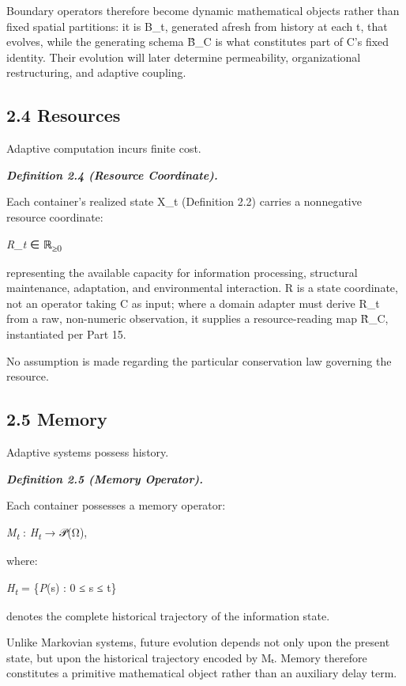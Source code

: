 \documentclass[
]{article}
\begin{document}
Boundary operators therefore become dynamic mathematical objects rather
than fixed spatial partitions: it is B\_t, generated afresh from history
at each t, that evolves, while the generating schema B̂\_C is what
constitutes part of C's fixed identity. Their evolution will later
determine permeability, organizational restructuring, and adaptive
coupling.

\hypertarget{resources}{%
\subsection{2.4 Resources}\label{resources}}

Adaptive computation incurs finite cost.

\emph{\textbf{Definition 2.4 (Resource Coordinate).}}

Each container's realized state X\_t (Definition 2.2) carries a
nonnegative resource coordinate:

\emph{R\_t} ∈ ℝ\textsubscript{≥0}

representing the available capacity for information processing,
structural maintenance, adaptation, and environmental interaction. R is
a state coordinate, not an operator taking C as input; where a domain
adapter must derive R\_t from a raw, non-numeric observation, it
supplies a resource-reading map R̂\_C, instantiated per Part 15.

No assumption is made regarding the particular conservation law
governing the resource.

\hypertarget{memory}{%
\subsection{2.5 Memory}\label{memory}}

Adaptive systems possess history.

\emph{\textbf{Definition 2.5 (Memory Operator).}}

Each container possesses a memory operator:

\emph{M\textsubscript{t}} : \emph{H\textsubscript{t}} → 𝒫(Ω),

where:

\emph{H\textsubscript{t}} = \{\emph{P}(s) : 0 ≤ s ≤ t\}

denotes the complete historical trajectory of the information state.

Unlike Markovian systems, future evolution depends not only upon the
present state, but upon the historical trajectory encoded by Mₜ. Memory
therefore constitutes a primitive mathematical object rather than an
auxiliary delay term.
\end{document}
